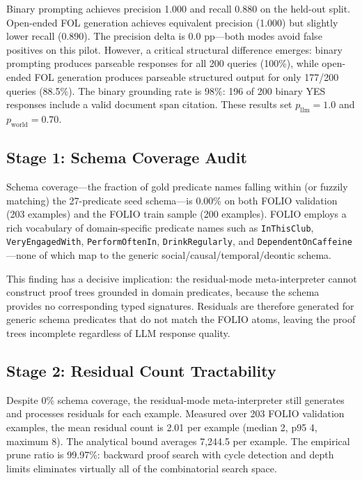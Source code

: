\documentclass[11pt,letterpaper]{article}
\begin{document}
Binary prompting achieves precision 1.000 and recall 0.880 on the held-out split. Open-ended FOL generation achieves equivalent precision (1.000) but slightly lower recall (0.890). The precision delta is 0.0 pp---both modes avoid false positives on this pilot. However, a critical structural difference emerges: binary prompting produces parseable responses for all 200 queries (100\%), while open-ended FOL generation produces parseable structured output for only 177/200 queries (88.5\%). The binary grounding rate is 98\%: 196 of 200 binary YES responses include a valid document span citation. These results set $p_{\text{llm}} = 1.0$ and $p_{\text{world}} = 0.70$.

\subsection{Stage 1: Schema Coverage Audit}
\label{sec:stage1}

Schema coverage---the fraction of gold predicate names falling within (or fuzzily matching) the 27-predicate seed schema---is 0.00\% on both FOLIO validation (203 examples) and the FOLIO train sample (200 examples). FOLIO employs a rich vocabulary of domain-specific predicate names such as \texttt{InThisClub}, \texttt{VeryEngagedWith}, \texttt{PerformOftenIn}, \texttt{DrinkRegularly}, and \texttt{DependentOnCaffeine}---none of which map to the generic social/causal/temporal/deontic schema.

This finding has a decisive implication: the residual-mode meta-interpreter cannot construct proof trees grounded in domain predicates, because the schema provides no corresponding typed signatures. Residuals are therefore generated for generic schema predicates that do not match the FOLIO atoms, leaving the proof trees incomplete regardless of LLM response quality.

\subsection{Stage 2: Residual Count Tractability}
\label{sec:stage2}

Despite 0\% schema coverage, the residual-mode meta-interpreter still generates and processes residuals for each example. Measured over 203 FOLIO validation examples, the mean residual count is 2.01 per example (median 2, p95 4, maximum 8). The analytical bound averages 7,244.5 per example. The empirical prune ratio is 99.97\%: backward proof search with cycle detection and depth limits eliminates virtually all of the combinatorial search space.
\end{document}
